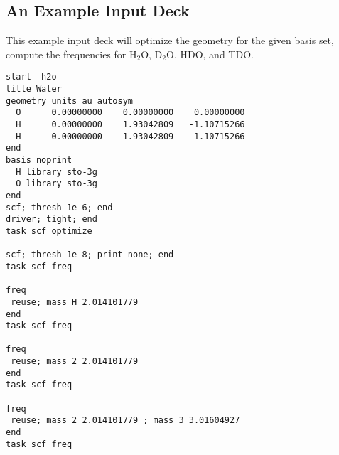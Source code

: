 \newpage

\subsection{An Example Input Deck}
This example input deck will optimize the geometry for the given basis
set, compute the frequencies for H$_2$O, D$_2$O, HDO, and TDO.
\begin{verbatim}
start  h2o
title Water 
geometry units au autosym
  O      0.00000000    0.00000000    0.00000000
  H      0.00000000    1.93042809   -1.10715266
  H      0.00000000   -1.93042809   -1.10715266
end
basis noprint
  H library sto-3g 
  O library sto-3g
end
scf; thresh 1e-6; end
driver; tight; end
task scf optimize

scf; thresh 1e-8; print none; end
task scf freq 

freq 
 reuse; mass H 2.014101779
end
task scf freq

freq
 reuse; mass 2 2.014101779
end
task scf freq

freq
 reuse; mass 2 2.014101779 ; mass 3 3.01604927
end
task scf freq
\end{verbatim}
